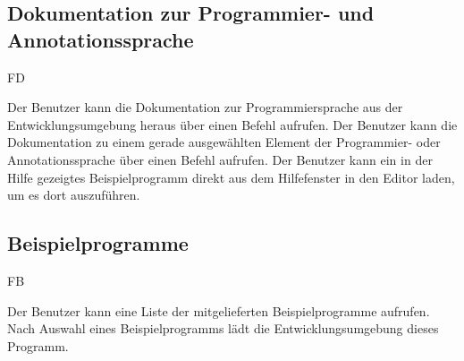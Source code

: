\subsection{Dokumentation zur Programmier- und Annotationssprache}%

\begin{reqlist}{FD}

{Der Benutzer kann die Dokumentation zur Programmiersprache aus der Entwicklungsumgebung heraus über einen Befehl aufrufen.}
{Der Benutzer kann die Dokumentation zu einem gerade ausgewählten Element der Programmier- oder Annotationssprache über einen Befehl aufrufen.}
{Der Benutzer kann ein in der Hilfe gezeigtes Beispielprogramm direkt aus dem Hilfefenster in den Editor laden, um es dort auszuführen.}

\end{reqlist}

\subsection{Beispielprogramme}%

\begin{reqlist}{FB}

{Der Benutzer kann eine Liste der mitgelieferten Beispielprogramme aufrufen. Nach Auswahl eines Beispielprogramms lädt die Entwicklungsumgebung dieses Programm.}

\end{reqlist}
